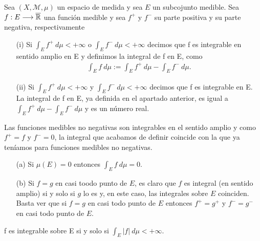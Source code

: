 \begin{defi}
    Sea $(X, \mathcal{M}, \mu)$ un espacio de medida y sea $E$ un subcojunto medible. Sea $f: E \longrightarrow \overline{\mathbb{R}}$ una función medible y sea $f^+$ y $f^-$ su parte positiva y su parte negativa, respectivamente
    \begin{enumerate}
        \item[(i)] Si $\int_{E}{f^+ \ d\mu} < +\infty$ o $\int_{E}{f^- \ d\mu} < +\infty$ decimos que f es integrable en sentido amplio en E y definimos la integral de f en E, como
              \begin{align*}
                  \int_{E}{f \ d\mu} := \int_{E}{f^+ \ d\mu} - \int_{E}{f^- \ d\mu}.
              \end{align*}
        \item[(ii)] Si $\int_{E}{f^+ \ d\mu} < +\infty$ y $\int_{E}{f^- \ d\mu} < +\infty$ decimos que f es integrable en E. La integral de f en E, ya definida en el apartado anterior, es igual a $\int_{E}{f^+ \ d\mu} - \int_{E}{f^- \ d\mu}$ y es un número real.
    \end{enumerate}
\end{defi}

\begin{obs}
    Las funciones medibles no negativas son integrables en el sentido amplio y como $f^+ = f$ y $f^- = 0$, la integral que acabamos de definir coincide con la que ya teníamos para funciones medibles no negativas.
\end{obs}

\begin{obs}
    \begin{enumerate}
        \item[(a)] Si $\mu(E) = 0$ entonces $\int_{E}{f \ d\mu} = 0$.
        \item[(b)] Si $f = g$ en casi toodo punto de $E$, es claro que $f$ es integral (en sentido amplio) si y solo si $g$ lo es y, en este caso, las integrales sobre $E$ coinciden. Basta ver que si $f = g$ en casi todo punto de $E$ entonces $f^+ = g^+$ y $f^- = g^-$ en casi todo punto de $E$.
    \end{enumerate}
\end{obs}

\begin{prop}
    f es integrable sobre E si y solo si $\int_{E}{|f| \ d\mu} < +\infty$.
\end{prop}

